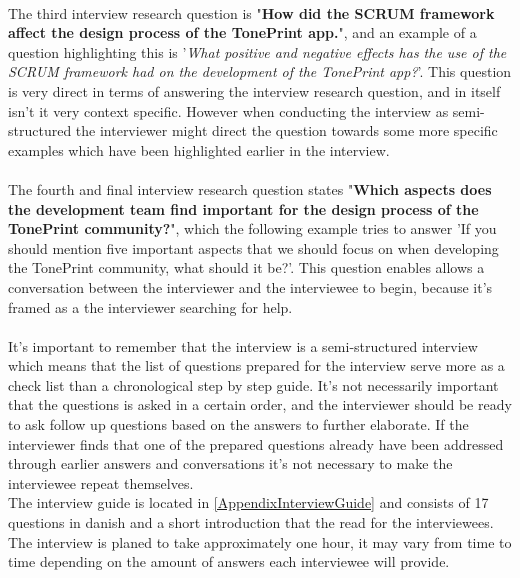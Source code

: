 \\
The third interview research question is "\textbf{How did the SCRUM framework affect the design process of the TonePrint app.}", and an example of a question highlighting this is '\textit{What positive and negative effects has the use of the SCRUM framework had on the development of the TonePrint app?}'. This question is very direct in terms of answering the interview research question, and in itself isn't it very context specific. However when conducting the interview as semi-structured the interviewer might direct the question towards some more specific examples which have been highlighted earlier in the interview.\\
\\
The fourth and final interview research question states "\textbf{Which aspects does the development team find important for the design process of the TonePrint community?}", which the following example tries to answer 'If you should mention five important aspects that we should focus on when developing the TonePrint community, what should it be?'. This question enables allows a conversation between the interviewer and the interviewee to begin, because it's framed as a the interviewer searching for help.\\
\\
It's important to remember that the interview is a semi-structured interview which means that the list of questions prepared for the interview serve more as a check list than a chronological step by step guide. It's not necessarily important that the questions is asked in a certain order, and the interviewer should be ready to ask follow up questions based on the answers to further elaborate. If the interviewer finds that one of the prepared questions already have been addressed through earlier answers and conversations it's not necessary to make the interviewee repeat themselves. \\
The interview guide is located in \autoref{AppendixInterviewGuide} and consists of 17 questions in danish and a short introduction that the read for the interviewees. The interview is planed to take approximately one hour, it may vary from time to time depending on the amount of answers each interviewee will provide.

